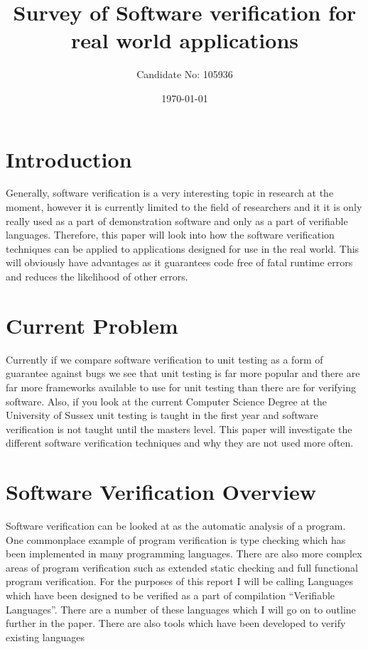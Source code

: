 \documentclass[a4paper,12pt]{scrartcl}
\title{Survey of Software verification for real world applications}
\author{Candidate No: 105936}
\date{\today}
\begin{document}
	
	\begin{titlepage}
		\maketitle
	\end{titlepage}
	
	\tableofcontents
	\newpage
	\section{Introduction}
	{
		Generally, software verification is a very interesting topic in research at the moment, however it is currently limited to the field of researchers and it it is only really used as a part of demonstration software and only as a part of verifiable languages. Therefore, this paper will look into how the software verification techniques can be applied to applications designed for use in the real world. This will obviously have advantages as it guarantees code free of fatal runtime errors and reduces the likelihood of other errors.
	}

	\section{Current Problem}
	{
		Currently if we compare software verification to unit testing as a form of guarantee against bugs we see that unit testing is far more popular and there are far more frameworks available to use for unit testing than there are for verifying software. Also, if you look at the current Computer Science Degree at the University of Sussex unit testing is taught in the first year and software verification is not taught until the masters level. This paper will investigate the different software verification techniques and why they are not used more often.
	}

	\section{Software Verification Overview}
	{
		Software verification can be looked at as the automatic analysis of a program. One commonplace example of program verification is type checking which has been implemented in many programming languages. There are also more complex areas of program verification such as extended static checking and full functional program verification. For the purposes of this report I will be calling Languages which have been designed to be verified as a part of compilation \enquote{Verifiable Languages}. There are a number of these languages which I will go on to outline further in the paper. There are also tools which have been developed to verify existing languages
	}
	
\end{document}
